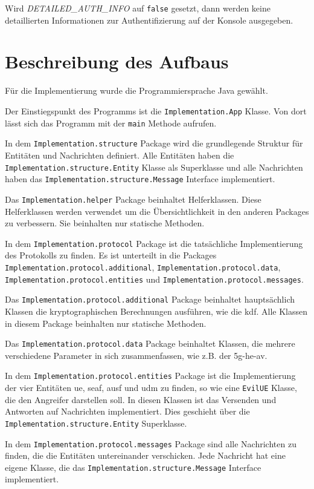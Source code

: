 Wird \textit{DETAILED\_AUTH\_INFO} auf \lstinline{false} gesetzt, dann werden keine detaillierten Informationen zur Authentifizierung auf der Konsole ausgegeben.


\section{Beschreibung des Aufbaus}
Für die Implementierung wurde die Programmiersprache Java gewählt.

Der Einstiegspunkt des Programms ist die \lstinline{Implementation.App} Klasse. Von dort lässt sich das Programm mit der \lstinline{main} Methode aufrufen.

In dem \lstinline{Implementation.structure} Package wird die grundlegende Struktur für Entitäten und Nachrichten definiert.
Alle Entitäten haben die \lstinline{Implementation.structure.Entity} Klasse als Superklasse und alle Nachrichten haben das \lstinline{Implementation.structure.Message} Interface implementiert.

Das \lstinline{Implementation.helper} Package beinhaltet Helferklassen.
Diese Helferklassen werden verwendet um die Übersichtlichkeit in den anderen Packages zu verbessern.
Sie beinhalten nur statische Methoden.

In dem \lstinline{Implementation.protocol} Package ist die tatsächliche Implementierung des Protokolls zu finden.
Es ist unterteilt in die Packages \lstinline{Implementation.protocol.additional}, \lstinline{Implementation.protocol.data}, \lstinline{Implementation.protocol.entities} und \lstinline{Implementation.protocol.messages}.

Das \lstinline{Implementation.protocol.additional} Package beinhaltet hauptsächlich Klassen die kryptographischen Berechnungen ausführen, wie die \gls{kdf}.
Alle Klassen in diesem Package beinhalten nur statische Methoden.

Das \lstinline{Implementation.protocol.data} Package beinhaltet Klassen, die mehrere verschiedene Parameter in sich zusammenfassen, wie z.B. der \gls{5g-he-av}.

In dem \lstinline{Implementation.protocol.entities} Package ist die Implementierung der vier Entitäten \gls{ue}, \gls{seaf}, \gls{ausf} und \gls{udm} zu finden, so wie eine \lstinline{EvilUE} Klasse, die den Angreifer darstellen soll.
In diesen Klassen ist das Versenden und Antworten auf Nachrichten implementiert.
Dies geschieht über die \lstinline{Implementation.structure.Entity} Superklasse.

In dem \lstinline{Implementation.protocol.messages} Package sind alle Nachrichten zu finden, die die Entitäten untereinander verschicken.
Jede Nachricht hat eine eigene Klasse, die das \lstinline{Implementation.structure.Message} Interface implementiert.


